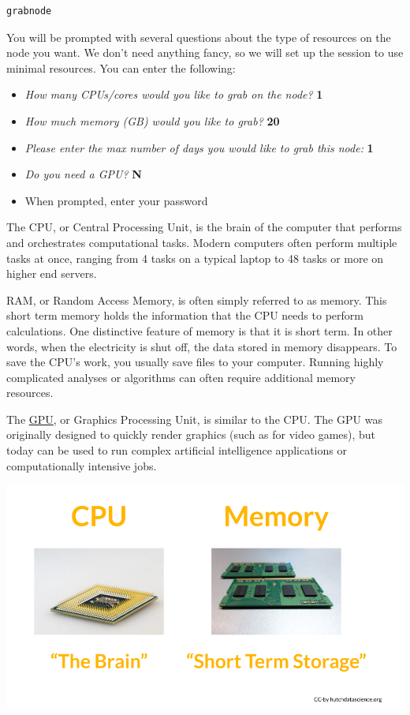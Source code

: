 \documentclass[
]{book}
\providecommand{\tightlist}{%
  \setlength{\itemsep}{0pt}\setlength{\parskip}{0pt}}
\begin{document}
\begin{verbatim}
grabnode
\end{verbatim}

You will be prompted with several questions about the type of resources on the node you want. We don't need anything fancy, so we will set up the session to use minimal resources. You can enter the following:

\begin{itemize}
\tightlist
\item
  \emph{How many CPUs/cores would you like to grab on the node?} \textbf{1}
\item
  \emph{How much memory (GB) would you like to grab?} \textbf{20}
\item
  \emph{Please enter the max number of days you would like to grab this node:} \textbf{1}
\item
  \emph{Do you need a GPU?} \textbf{N}
\item
  When prompted, enter your password
\end{itemize}

The CPU, or Central Processing Unit, is the brain of the computer that performs and orchestrates computational tasks. Modern computers often perform multiple tasks at once, ranging from 4 tasks on a typical laptop to 48 tasks or more on higher end servers.

RAM, or Random Access Memory, is often simply referred to as memory. This short term memory holds the information that the CPU needs to perform calculations. One distinctive feature of memory is that it is short term. In other words, when the electricity is shut off, the data stored in memory disappears. To save the CPU's work, you usually save files to your computer. Running highly complicated analyses or algorithms can often require additional memory resources.

The \href{https://www.intel.com/content/www/us/en/products/docs/processors/what-is-a-gpu.html}{GPU}, or Graphics Processing Unit, is similar to the CPU. The GPU was originally designed to quickly render graphics (such as for video games), but today can be used to run complex artificial intelligence applications or computationally intensive jobs.

\begin{center}\includegraphics[width=0.8\linewidth]{resources/images/07-interactive_files/figure-latex//1BQxrVYdKZTbpCaF-i_q9w7s9x034lEXpQZDU-Sl09cs_gff2211b72f_1_26} \end{center}
\end{document}
